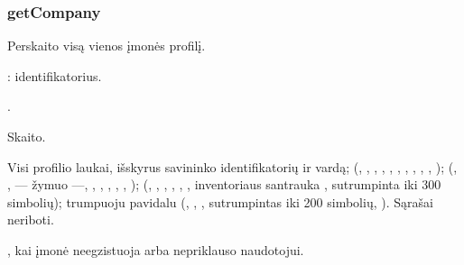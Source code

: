 \subsubsection{getCompany}\label{sec:tools:getCompany}
\begin{description}[style=multiline, leftmargin=19mm, labelwidth=17mm, labelsep=2mm,
  font=\sffamily\bfseries\footnotesize\color{ink}, itemsep=1pt, topsep=2pt, before=\raggedright]
  \item[Paskirtis] Perskaito visą vienos įmonės profilį.
  \item[Įvestis] : identifikatorius.
  \item[Užklausos] .
  \item[Pobūdis] Skaito.
  \item[Grąžina] Visi profilio laukai, išskyrus savininko identifikatorių ir vardą;
     (, , , , ,
    , , , , ,
    );  (, ,  --- žymuo
    ---, , , , , ,
    );  (, , , ,
    , , inventoriaus santrauka ,
    sutrumpinta iki 300 simbolių);  trumpuoju pavidalu (, ,
    , sutrumpintas iki 200 simbolių, ). Sąrašai neriboti.
  \item[Klaidos] , kai įmonė neegzistuoja arba nepriklauso naudotojui.
\end{description}

